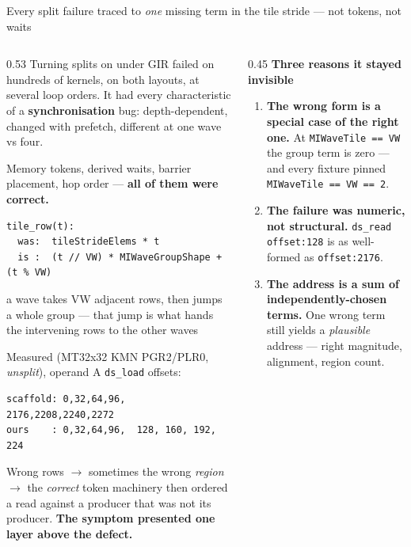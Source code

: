 \documentclass[aspectratio=169,9pt]{beamer}
\newcommand{\tsub}[1]{{\footnotesize\color{gray}#1}}
\newcommand{\key}[1]{\textcolor{acc}{\textbf{#1}}}
\newcommand{\bad}[1]{\textcolor{warn}{\textbf{#1}}}
\newcommand{\good}[1]{\textcolor{ok}{\textbf{#1}}}
\begin{document}
\begin{frame}[fragile]{Every split failure traced to \emph{one} missing term in the tile stride --- not tokens, not waits}

\begin{columns}[T]
\begin{column}{0.53\textwidth}
\footnotesize
Turning splits on under GIR failed on hundreds of kernels, on both layouts, at several loop
orders. It had every characteristic of a \bad{synchronisation} bug: depth-dependent, changed with
prefetch, different at one wave vs four.

\smallskip
Memory tokens, derived waits, barrier placement, hop order --- \good{all of them were correct.}

\begin{lstlisting}[style=pseudo]
tile_row(t):
  was:  tileStrideElems * t
  is :  (t // VW) * MIWaveGroupShape + (t % VW)
\end{lstlisting}
\tsub{a wave takes VW adjacent rows, then jumps a whole group --- that jump is what hands the
intervening rows to the other waves}

\smallskip
Measured (MT32x32 KMN PGR2/PLR0, \emph{unsplit}), operand A \texttt{ds\_load} offsets:
\begin{lstlisting}[style=pseudo]
scaffold: 0,32,64,96, 2176,2208,2240,2272
ours    : 0,32,64,96,  128, 160, 192, 224
\end{lstlisting}
Wrong rows $\rightarrow$ sometimes the wrong \emph{region} $\rightarrow$ the \emph{correct} token
machinery then ordered a read against a producer that was not its producer. \key{The symptom
presented one layer above the defect.}
\end{column}

\begin{column}{0.45\textwidth}
\footnotesize
\textbf{Three reasons it stayed invisible}
\begin{enumerate}\itemsep1pt\parskip0pt
\item \bad{The wrong form is a special case of the right one.} At \texttt{MIWaveTile == VW} the
group term is zero --- and every fixture pinned \texttt{MIWaveTile == VW == 2}.
\item \bad{The failure was numeric, not structural.} \texttt{ds\_read offset:128} is as
well-formed as \texttt{offset:2176}.
\item \bad{The address is a sum of independently-chosen terms.} One wrong term still yields a
\emph{plausible} address --- right magnitude, alignment, region count.
\end{enumerate}


\end{column}
\end{columns}
\end{frame}
\end{document}

